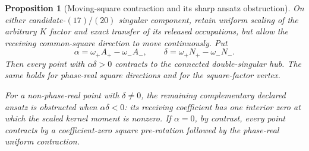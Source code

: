 \documentclass[11pt]{article}
\newtheorem{proposition}[theorem]{Proposition}
\theoremstyle{definition}
\theoremstyle{remark}
\begin{document}
\begin{proposition}[Moving-square contraction and its sharp ansatz obstruction]
\label{prop:candidate-17-20-moving-square-contraction}
On either candidate-\((17)/(20)\) singular component, retain uniform scaling
of the arbitrary \(K\) factor and exact transfer of its released occupations,
but allow the receiving common-square direction to move continuously.  Put
\[
 \alpha=\omega_+A_+-\omega_-A_-,
 \qquad
 \delta=\omega_+N_+-\omega_-N_-.
\]
Then every point with \(\alpha\delta>0\) contracts to the connected
double-singular hub.  The same holds for phase-real square directions and
for the square-factor vertex.

For a non-phase-real point with \(\delta\neq0\), the remaining complementary
declared ansatz is obstructed when \(\alpha\delta<0\): its receiving
coefficient has one interior zero at which the scaled kernel moment is
nonzero.  If \(\alpha=0\), by contrast, every point contracts by a
coefficient-zero square pre-rotation followed by the phase-real uniform
contraction.
\end{proposition}
\end{document}
